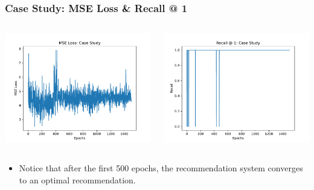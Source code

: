 \documentclass{beamer}
\begin{document}
\begin{frame}[fragile]
\frametitle{Case Study: MSE Loss \& Recall @ 1}

\begin{columns}
\begin{column}{0.55\textwidth}
    \begin{minipage}[c]{\linewidth}
        \includegraphics[width=\linewidth]{GNN/imgs/CaseStudyLoss.pdf}
    \end{minipage}
\end{column}
\begin{column}{0.55\textwidth}
    \begin{minipage}[c]{\linewidth}
        \includegraphics[width=\linewidth]{GNN/imgs/CaseStudyRecall.pdf}
    \end{minipage}
\end{column}
\end{columns}

\vspace{0.5cm}

\begin{itemize}
    \item Notice that after the first 500 epochs, the recommendation system converges to an optimal recommendation.
\end{itemize}

\end{frame}
\end{document}
